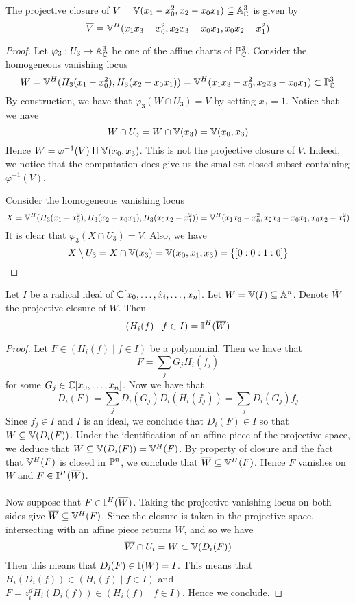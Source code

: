 \documentclass[a4paper]{article}
\begin{document}
\begin{eg}{}{} The projective closure of $V=\mathbb{V}(x_1-x_0^2,x_2-x_0x_1)\subseteq\mathbb{A}_{\mathbb{C}}^3$ is given by $$\overline{V}=\mathbb{V}^H(x_1x_3-x_0^2,x_2x_3-x_0x_1,x_0x_2-x_1^2)$$ \tcbline
\begin{proof}
Let $\varphi_3:U_3\to\mathbb{A}_{\mathbb{C}}^3$ be one of the affine charts of $\mathbb{P}_{\mathbb{C}}^3$. Consider the homogeneous vanishing locus $$W=\mathbb{V}^H(H_3(x_1-x_0^2),H_3(x_2-x_0x_1))=\mathbb{V}^H(x_1x_3-x_0^2, x_2x_3-x_0x_1)\subset\mathbb{P}_{\mathbb{C}}^3$$ By construction, we have that $\varphi_3(W\cap U_3)=V$ by setting $x_3=1$. Notice that we have $$W\cap U_3=W\cap\mathbb{V}(x_3)=\mathbb{V}(x_0,x_3)$$ Hence $W=\varphi^{-1}(V)\amalg\mathbb{V}(x_0,x_3)$. This is not the projective closure of $V$. Indeed, we notice that the computation does give us the smallest closed subset containing $\varphi^{-1}(V)$. 

Consider the homogeneous vanishing locus $$X=\mathbb{V}^H(H_3(x_1-x_0^2),H_3(x_2-x_0x_1),H_3(x_0x_2-x_1^2))=\mathbb{V}^H(x_1x_3-x_0^2,x_2x_3-x_0x_1,x_0x_2-x_1^2)$$ It is clear that $\varphi_3(X\cap U_3)=V$. Also, we have $$X\setminus U_3=X\cap\mathbb{V}(x_3)=\mathbb{V}(x_0,x_1,x_3)=\{[0:0:1:0]\}$$
\end{proof}
\end{eg}

\begin{prp}{}{} Let $I$ be a radical ideal of $\mathbb{C}[x_0,\dots,\hat{x}_i,\dots,x_n]$. Let $W=\mathbb{V}(I)\subseteq\mathbb{A}^n$. Denote $\overline{W}$ the projective closure of $W$. Then $$(H_i(f)\;|\;f\in I)=\mathbb{I}^H(\overline{W})$$ \tcbline
\begin{proof}
Let $F\in(H_i(f)\;|\;f\in I)$ be a polynomial. Then we have that $$F=\sum_j G_jH_i(f_j)$$ for some $G_j\in\mathbb{C}[x_0,\dots,x_n]$. Now we have that $$D_i(F)=\sum_jD_i(G_j)D_i(H_i(f_j))=\sum_jD_i(G_j)f_j$$ Since $f_j\in I$ and $I$ is an ideal, we conclude that $D_i(F)\in I$ so that $W\subseteq\mathbb{V}(D_i(F))$. Under the identification of an affine piece of the projective space, we deduce that $W\subseteq\mathbb{V}(D_i(F))=\mathbb{V}^H(F)$. By property of closure and the fact that $\mathbb{V}^H(F)$ is closed in $\mathbb{P}^n$, we conclude that $\overline{W}\subseteq\mathbb{V}^H(F)$. Hence $F$ vanishes on $\overline{W}$ and $F\in\mathbb{I}^H(\overline{W})$. \\~\\

Now suppose that $F\in\mathbb{I}^H(\overline{W})$. Taking the projective vanishing locus on both sides give $\overline{W}\subseteq\mathbb{V}^H(F)$. Since the closure is taken in the projective space, intersecting with an affine piece returns $W$, and so we have $$\overline{W}\cap U_i=W\subset\mathbb{V}(D_i(F))$$ Then this means that $D_i(F)\in\mathbb{I}(W)=I$. This means that $H_i(D_i(f))\in(H_i(f)\;|\;f\in I)$ and $F=z_i^dH_i(D_i(f))\in(H_i(f)\;|\;f\in I)$. Hence we conclude. 
\end{proof}
\end{prp}
\end{document}
